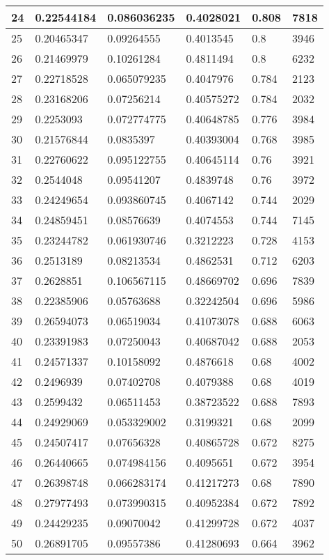 \begin{longtable}{|l|l|l|l|l|l|}
24 & 0.22544184 & 0.086036235 & 0.4028021 & 0.808 & 7818 \\ \hline 
25 & 0.20465347 & 0.09264555 & 0.4013545 & 0.8 & 3946 \\ \hline 
26 & 0.21469979 & 0.10261284 & 0.4811494 & 0.8 & 6232 \\ \hline 
27 & 0.22718528 & 0.065079235 & 0.4047976 & 0.784 & 2123 \\ \hline 
28 & 0.23168206 & 0.07256214 & 0.40575272 & 0.784 & 2032 \\ \hline 
29 & 0.2253093 & 0.072774775 & 0.40648785 & 0.776 & 3984 \\ \hline 
30 & 0.21576844 & 0.0835397 & 0.40393004 & 0.768 & 3985 \\ \hline 
31 & 0.22760622 & 0.095122755 & 0.40645114 & 0.76 & 3921 \\ \hline 
32 & 0.2544048 & 0.09541207 & 0.4839748 & 0.76 & 3972 \\ \hline 
33 & 0.24249654 & 0.093860745 & 0.4067142 & 0.744 & 2029 \\ \hline 
34 & 0.24859451 & 0.08576639 & 0.4074553 & 0.744 & 7145 \\ \hline 
35 & 0.23244782 & 0.061930746 & 0.3212223 & 0.728 & 4153 \\ \hline 
36 & 0.2513189 & 0.08213534 & 0.4862531 & 0.712 & 6203 \\ \hline 
37 & 0.2628851 & 0.106567115 & 0.48669702 & 0.696 & 7839 \\ \hline 
38 & 0.22385906 & 0.05763688 & 0.32242504 & 0.696 & 5986 \\ \hline 
39 & 0.26594073 & 0.06519034 & 0.41073078 & 0.688 & 6063 \\ \hline 
40 & 0.23391983 & 0.07250043 & 0.40687042 & 0.688 & 2053 \\ \hline 
41 & 0.24571337 & 0.10158092 & 0.4876618 & 0.68 & 4002 \\ \hline 
42 & 0.2496939 & 0.07402708 & 0.4079388 & 0.68 & 4019 \\ \hline 
43 & 0.2599432 & 0.06511453 & 0.38723522 & 0.688 & 7893 \\ \hline 
44 & 0.24929069 & 0.053329002 & 0.3199321 & 0.68 & 2099 \\ \hline 
45 & 0.24507417 & 0.07656328 & 0.40865728 & 0.672 & 8275 \\ \hline 
46 & 0.26440665 & 0.074984156 & 0.4095651 & 0.672 & 3954 \\ \hline 
47 & 0.26398748 & 0.066283174 & 0.41217273 & 0.68 & 7890 \\ \hline 
48 & 0.27977493 & 0.073990315 & 0.40952384 & 0.672 & 7892 \\ \hline 
49 & 0.24429235 & 0.09070042 & 0.41299728 & 0.672 & 4037 \\ \hline 
50 & 0.26891705 & 0.09557386 & 0.41280693 & 0.664 & 3962 \\ \hline 
\end{longtable}